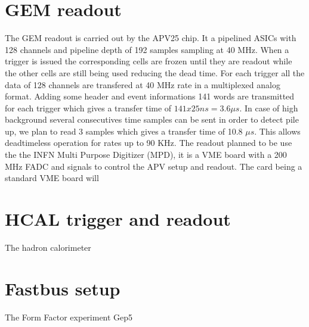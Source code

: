\documentclass{article}
\begin{document}
\section{GEM readout}
The GEM readout is carried out by the APV25 chip. It a pipelined ASICs with 128 channels and pipeline depth of 192 samples sampling at 40 MHz. When a trigger is issued the corresponding cells are frozen until they are readout while the other cells are still being used reducing the dead time.
For each trigger all the data of 128 channels are transfered at 40 MHz rate in a multiplexed analog format. Adding some header and event informations 141 words are transmitted for each trigger which gives a transfer time of $141x25 ns = 3.6 \mu s $. In case of high background several consecutives time samples can be sent in order to detect pile up, we plan to read 3 samples which gives a transfer time of 10.8 $\mu s$. This allows deadtimeless operation for rates up to 90 KHz. The readout planned to be use the the INFN Multi Purpose Digitizer (MPD), it is a VME board with a 200 MHz FADC and signals to control the APV setup and readout. 
The card being a standard VME board will 

\section{HCAL trigger and readout}
The hadron calorimeter
\section{}



\section{Fastbus setup}



The Form Factor experiment Gep5
\end{document}

